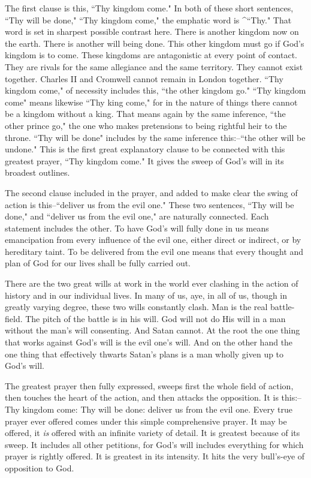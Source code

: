 The first clause is this, ``Thy kingdom come." In both of these short
sentences, ``Thy will be done," ``Thy kingdom come," the emphatic word is
^``Thy." That word is set in sharpest possible contrast here. There is
another kingdom now on the earth. There is another will being done. This
other kingdom must go if God's kingdom is to come. These kingdoms are
antagonistic at every point of contact. They are rivals for the same
allegiance and the same territory. They cannot exist together. Charles II
and Cromwell cannot remain in London together. ``Thy kingdom come," of
necessity includes this, ``the other kingdom go." ``Thy kingdom come" means
likewise ``Thy king come," for in the nature of things there cannot be a
kingdom without a king. That means again by the same inference, ``the other
prince go," the one who makes pretensions to being rightful heir to the
throne. ``Thy will be done" includes by the same inference this:--``the
other will be undone." This is the first great explanatory clause to be
connected with this greatest prayer, ``Thy kingdom come." It gives the
sweep of God's will in its broadest outlines.

The second clause included in the prayer, and added to make clear the
swing of action is this--``deliver us from the evil one." These two
sentences, ``Thy will be done," and ``deliver us from the evil one," are
naturally connected. Each statement includes the other. To have God's will
fully done in us means emancipation from every influence of the evil one,
either direct or indirect, or by hereditary taint. To be delivered from
the evil one means that every thought and plan of God for our lives shall
be fully carried out.

There are the two great wills at work in the world ever clashing in the
action of history and in our individual lives. In many of us, aye, in all
of us, though in greatly varying degree, these two wills constantly clash.
Man is the real battle-field. The pitch of the battle is in his will. God
will not do His will in a man without the man's will consenting. And Satan
cannot. At the root the one thing that works against God's will is the
evil one's will. And on the other hand the one thing that effectively
thwarts Satan's plans is a man wholly given up to God's will.

The greatest prayer then fully expressed, sweeps first the whole field of
action, then touches the heart of the action, and then attacks the
opposition. It is this:--Thy kingdom come: Thy will be done: deliver us
from the evil one. Every true prayer ever offered comes under this simple
comprehensive prayer. It may be offered, it \textit{is} offered with an infinite
variety of detail. It is greatest because of its sweep. It includes all
other petitions, for God's will includes everything for which prayer is
rightly offered. It is greatest in its intensity. It hits the very
bull's-eye of opposition to God.




